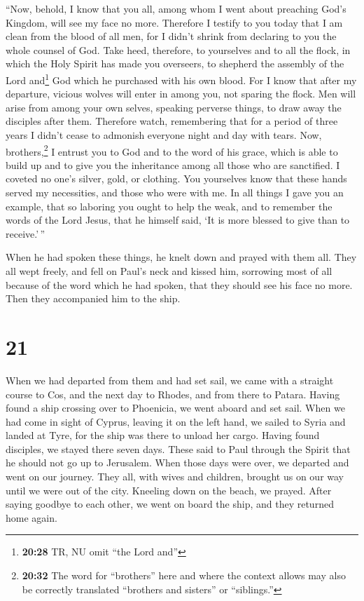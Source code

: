  ``Now, behold, I know that you all, among whom I went
about preaching God's Kingdom, will see my face no more. 
Therefore I testify to you today that I am clean from the blood of all
men,  for I didn't shrink from declaring to you the whole
counsel of God.  Take heed, therefore, to yourselves and
to all the flock, in which the Holy Spirit has made you overseers, to
shepherd the assembly of the Lord and\footnote{\textbf{20:28} TR, NU
  omit ``the Lord and''} God which he purchased with his own blood.
 For I know that after my departure, vicious wolves will
enter in among you, not sparing the flock.  Men will
arise from among your own selves, speaking perverse things, to draw away
the disciples after them.  Therefore watch, remembering
that for a period of three years I didn't cease to admonish everyone
night and day with tears.  Now, brothers,\footnote{\textbf{20:32}
  The word for ``brothers'' here and where the context allows may also
  be correctly translated ``brothers and sisters'' or ``siblings.''} I
entrust you to God and to the word of his grace, which is able to build
up and to give you the inheritance among all those who are sanctified.
 I coveted no one's silver, gold, or clothing.
 You yourselves know that these hands served my
necessities, and those who were with me.  In all things I
gave you an example, that so laboring you ought to help the weak, and to
remember the words of the Lord Jesus, that he himself said, `It is more
blessed to give than to receive.'\,''

 When he had spoken these things, he knelt down and
prayed with them all.  They all wept freely, and fell on
Paul's neck and kissed him,  sorrowing most of all
because of the word which he had spoken, that they should see his face
no more. Then they accompanied him to the ship.

\hypertarget{section-20}{%
\section{21}\label{section-20}}

 When we had departed from them and had set sail, we came
with a straight course to Cos, and the next day to Rhodes, and from
there to Patara.  Having found a ship crossing over to
Phoenicia, we went aboard and set sail.  When we had come
in sight of Cyprus, leaving it on the left hand, we sailed to Syria and
landed at Tyre, for the ship was there to unload her cargo.
 Having found disciples, we stayed there seven days. These
said to Paul through the Spirit that he should not go up to Jerusalem.
 When those days were over, we departed and went on our
journey. They all, with wives and children, brought us on our way until
we were out of the city. Kneeling down on the beach, we prayed.
 After saying goodbye to each other, we went on board the
ship, and they returned home again.

